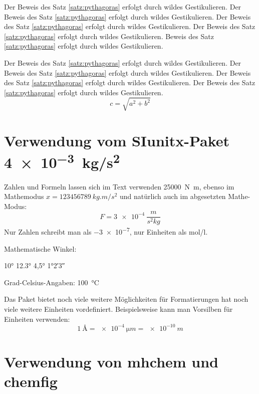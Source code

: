 \begin{beweis}
Der Beweis des Satz \ref{satz:pythagoras} erfolgt durch wildes Gestikulieren. Der Beweis des Satz \ref{satz:pythagoras} erfolgt durch wildes Gestikulieren. Der Beweis des Satz \ref{satz:pythagoras} erfolgt durch wildes Gestikulieren. Der Beweis des Satz \ref{satz:pythagoras} erfolgt durch wildes Gestikulieren.  Beweis des Satz \ref{satz:pythagoras} erfolgt durch wildes Gestikulieren. 
 
\beweisende  %
\end{beweis}


\begin{beweis}
Der Beweis des Satz \ref{satz:pythagoras} erfolgt durch wildes Gestikulieren. Der Beweis des Satz \ref{satz:pythagoras} erfolgt durch wildes Gestikulieren. Der Beweis des Satz \ref{satz:pythagoras} erfolgt durch wildes Gestikulieren. Der Beweis des Satz \ref{satz:pythagoras} erfolgt durch wildes Gestikulieren. 
\[
c = \sqrt{a^2 + b^2}
\]

\beweisendemathe %
\end{beweis}




\section{Verwendung vom SIunitx-Paket \SI{4 e-3}{kg/s^2}}


Zahlen und Formeln lassen sich  im Text verwenden \SI{25000}{N m}, ebenso  im Mathemodus $x = \SI{123456789}{kg.m/s^2}$ und natürlich auch im abgesetzten Mathe-Modus:
\[
F = \SI{3e-4}{\frac{m}{s^2 kg}}
\]
Nur Zahlen schreibt man als \num{-3 e-7}, nur Einheiten als \si{mol/l}. 

Mathematische Winkel:

\ang{10} \hfill  \ang{12.3} \hfill  \ang{4,5} \hfill  \ang{1;2;3}

Grad-Celsius-Angaben: \SI{100}{\degreeCelsius}

Das Paket bietet noch viele weitere Möglichkeiten für Formatierungen hat noch viele weitere Einheiten vordefiniert.  Beispielsweise kann man Vorsilben für Einheiten verwenden:
\[
\SI{1}{\angstrom} = \SI{e-4}{\micro m} = \SI{e-10}{m}
\]

\section{Verwendung von mhchem und chemfig}

